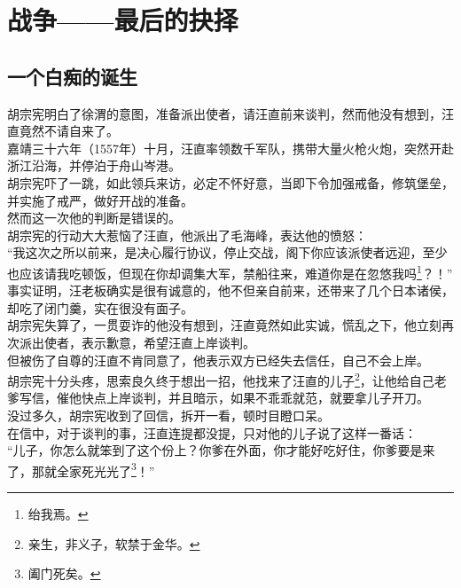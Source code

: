 \section{战争——最后的抉择}
\ifnum{}
	\begin{multicols}{\theparacolNo}
\fi
\subsection{一个白痴的诞生}
胡宗宪明白了徐渭的意图，准备派出使者，请汪直前来谈判，然而他没有想到，汪直竟然不请自来了。\\

嘉靖三十六年（1557年）十月，汪直率领数千军队，携带大量火枪火炮，突然开赴浙江沿海，并停泊于舟山岑港。\\

胡宗宪吓了一跳，如此领兵来访，必定不怀好意，当即下令加强戒备，修筑堡垒，并实施了戒严，做好开战的准备。\\

然而这一次他的判断是错误的。\\

胡宗宪的行动大大惹恼了汪直，他派出了毛海峰，表达他的愤怒：\\

“我这次之所以前来，是决心履行协议，停止交战，阁下你应该派使者远迎，至少也应该请我吃顿饭，但现在你却调集大军，禁船往来，难道你是在忽悠我吗\footnote{绐我焉。}？！”\\

事实证明，汪老板确实是很有诚意的，他不但亲自前来，还带来了几个日本诸侯，却吃了闭门羹，实在很没有面子。\\

胡宗宪失算了，一贯耍诈的他没有想到，汪直竟然如此实诚，慌乱之下，他立刻再次派出使者，表示歉意，希望汪直上岸谈判。\\

但被伤了自尊的汪直不肯同意了，他表示双方已经失去信任，自己不会上岸。\\

胡宗宪十分头疼，思索良久终于想出一招，他找来了汪直的儿子\footnote{亲生，非义子，软禁于金华。}，让他给自己老爹写信，催他快点上岸谈判，并且暗示，如果不乖乖就范，就要拿儿子开刀。\\

没过多久，胡宗宪收到了回信，拆开一看，顿时目瞪口呆。\\

在信中，对于谈判的事，汪直连提都没提，只对他的儿子说了这样一番话：\\

“儿子，你怎么就笨到了这个份上？你爹在外面，你才能好吃好住，你爹要是来了，那就全家死光光了\footnote{阖门死矣。}！”\\


\end{multicols}
